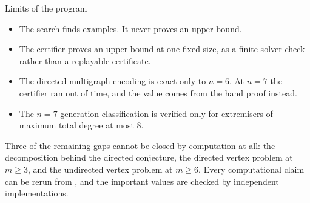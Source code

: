 \documentclass[aspectratio=1610,11pt]{beamer}
\begin{document}
\begin{frame}{Limits of the program}
\vfill
\begin{itemize}\setlength{\itemsep}{10pt}
  \item[{\color{stOpen}$\blacksquare$}] The search finds examples. It never proves an upper bound.
  \item[{\color{stOpen}$\blacksquare$}] The certifier proves an upper bound at one fixed size, as a finite solver check rather than a replayable certificate.
  \item[{\color{stOpen}$\blacksquare$}] The directed multigraph encoding is exact only to $n=6$. At $n=7$ the certifier ran out of time, and the value comes from the hand proof instead.
  \item[{\color{stOpen}$\blacksquare$}] The $n=7$ generation classification is verified only for extremisers of maximum total degree at most $8$.
\end{itemize}

\vspace{18pt}
\begin{minipage}{0.9\textwidth}
{\footnotesize\color{black!60} Three of the remaining gaps cannot be closed by computation at all: the decomposition behind the directed conjecture, the directed vertex problem at $m\ge3$, and the undirected vertex problem at $m\ge6$. Every computational claim can be rerun from , and the important values are checked by independent implementations.}
\end{minipage}
\vfill
\end{frame}
\end{document}
